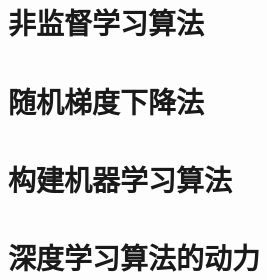 \section{非监督学习算法}
\label{sec:5.8}

\section{随机梯度下降法}
\label{sec:5.9}

\section{构建机器学习算法}
\label{sec:5.10}

\section{深度学习算法的动力}
\label{sec:5.11}
